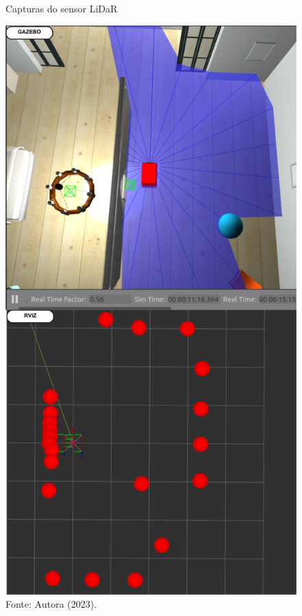 \begin{figure}[H]
    \centering
    \caption{Capturas do sensor LiDaR}
    \includegraphics[scale=0.25]{laser.png}
    \caption*{Fonte: Autora (2023).}
    \label{fig:visaoLidar}
\end{figure}

